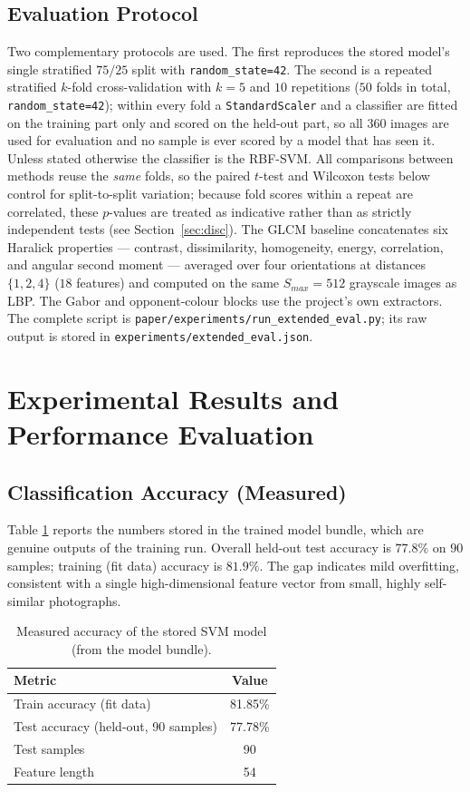 \documentclass[conference]{IEEEtran}
\begin{document}
\subsection{Evaluation Protocol}
Two complementary protocols are used. The first reproduces the stored
model's single stratified $75/25$ split with \texttt{random\_state=42}. The
second is a repeated stratified $k$-fold cross-validation with $k=5$ and
$10$ repetitions ($50$ folds in total, \texttt{random\_state=42}); within
every fold a \texttt{StandardScaler} and a classifier are fitted on the
training part only and scored on the held-out part, so all $360$ images are
used for evaluation and no sample is ever scored by a model that has seen
it. Unless stated otherwise the classifier is the RBF-SVM. All comparisons
between methods reuse the \emph{same} folds, so the paired $t$-test and
Wilcoxon tests below control for split-to-split variation; because fold
scores within a repeat are correlated, these $p$-values are treated as
indicative rather than as strictly independent tests (see
Section~\ref{sec:disc}). The GLCM baseline concatenates six
Haralick properties --- contrast, dissimilarity, homogeneity, energy,
correlation, and angular second moment --- averaged over four orientations
at distances $\{1,2,4\}$ ($18$ features) and computed on the same
$S_{max}=512$ grayscale images as LBP. The Gabor and opponent-colour blocks
use the project's own extractors. The complete script is
\texttt{paper/experiments/run\_extended\_eval.py}; its raw output is stored
in \texttt{experiments/extended\_eval.json}.

\section{Experimental Results and Performance Evaluation}\label{sec:results}
\subsection{Classification Accuracy (Measured)}
Table \ref{tab:acc} reports the numbers stored in the trained model bundle,
which are genuine outputs of the training run. Overall held-out test
accuracy is $77.8\%$ on $90$ samples; training (fit data) accuracy is
$81.9\%$. The gap indicates mild overfitting, consistent with a single
high-dimensional feature vector from small, highly self-similar
photographs.

\begin{table}[!t]
\renewcommand{\arraystretch}{1.2}
\caption{Measured accuracy of the stored SVM model (from the model bundle).}
\label{tab:acc}
\centering
\begin{tabular}{@{}lc@{}}
\hline
\bfseries Metric & \bfseries Value\\
\hline
Train accuracy (fit data) & 81.85\%\\
Test accuracy (held-out, 90 samples) & 77.78\%\\
Test samples & 90\\
Feature length & 54\\
\hline
\end{tabular}
\end{table}
\end{document}

